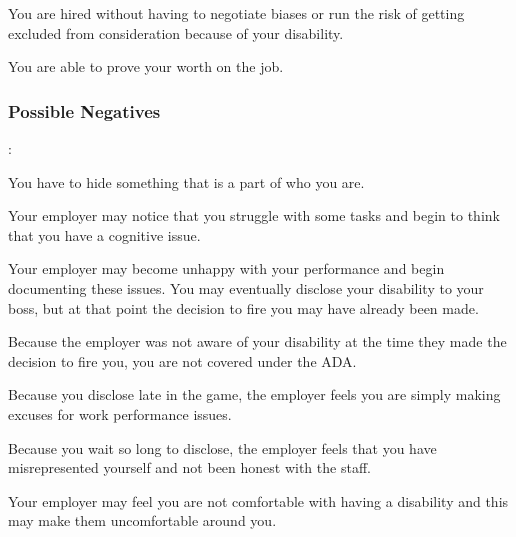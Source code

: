 You are hired without having to negotiate biases or run the risk of getting excluded from consideration because of your disability.

You are able to prove your worth on the job.

\subsubsection*{Possible Negatives}:

You have to hide something that is a part of who you are.

Your employer may notice that you struggle with some tasks and begin to think that you have a cognitive issue.

Your employer may become unhappy with your performance and begin documenting these issues. You may eventually disclose your disability to your boss, but at that point the decision to fire you may have already been made.

Because the employer was not aware of your disability at the time they made the decision to fire you, you are not covered under the ADA.

Because you disclose late in the game, the employer feels you are simply making excuses for work performance issues.

Because you wait so long to disclose, the employer feels that you have misrepresented yourself and not been honest with the staff.

Your employer may feel you are not comfortable with having a disability and this may make them uncomfortable around you.

